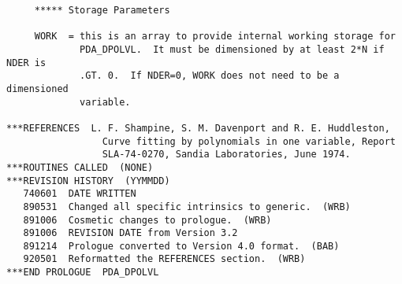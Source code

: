 \begin{verbatim}
     ***** Storage Parameters

     WORK  = this is an array to provide internal working storage for
             PDA_DPOLVL.  It must be dimensioned by at least 2*N if NDER is
             .GT. 0.  If NDER=0, WORK does not need to be a dimensioned
             variable.

***REFERENCES  L. F. Shampine, S. M. Davenport and R. E. Huddleston,
                 Curve fitting by polynomials in one variable, Report
                 SLA-74-0270, Sandia Laboratories, June 1974.
***ROUTINES CALLED  (NONE)
***REVISION HISTORY  (YYMMDD)
   740601  DATE WRITTEN
   890531  Changed all specific intrinsics to generic.  (WRB)
   891006  Cosmetic changes to prologue.  (WRB)
   891006  REVISION DATE from Version 3.2
   891214  Prologue converted to Version 4.0 format.  (BAB)
   920501  Reformatted the REFERENCES section.  (WRB)
***END PROLOGUE  PDA_DPOLVL
\end{verbatim}

